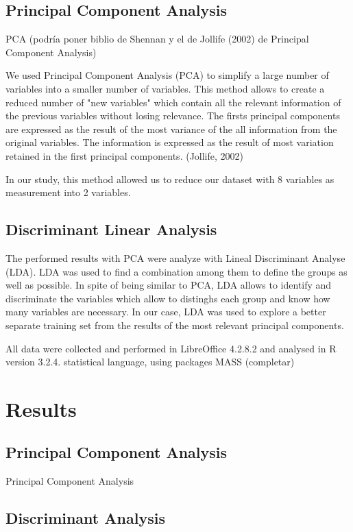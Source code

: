 \documentclass[review]{elsarticle}
\begin{document}
\subsection{Principal Component Analysis}

PCA (podría poner biblio de Shennan y el de Jollife (2002) de Principal Component Analysis)

We used Principal Component Analysis (PCA) to simplify a large number of variables into a smaller number of variables. This method allows to create a reduced number of "new variables" which contain all the relevant information of the previous variables without losing relevance. The firsts principal components are expressed as the result of the most variance of the all information from the original variables.  
The information is expressed as the result of most variation retained in the first principal components. (Jollife, 2002)
  

In our study, this method allowed us to reduce our dataset with 8 variables as measurement into 2 variables. 

\subsection{Discriminant Linear Analysis} 


The performed results with PCA were analyze with Lineal Discriminant Analyse (LDA). LDA was used to find a combination among them to define the groups as well as possible. In spite of being similar to PCA, LDA allows to identify and discriminate the variables which allow to distinghs each group and know how many variables are necessary. In our case, LDA was used to explore a better separate training set from the results of the most relevant principal components. 

All data were collected and performed in LibreOffice 4.2.8.2 and analysed in R version 3.2.4. statistical language, using packages MASS (completar)


\section{Results}

\subsection{Principal Component Analysis}

Principal Component Analysis

\subsection{Discriminant Analysis}
\end{document}
